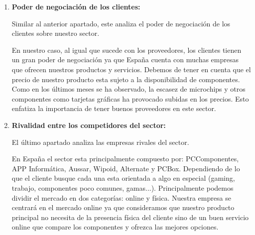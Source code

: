 \begin{enumerate}
    \item \textbf{Poder de negociación de los clientes:}
    
    Similar al anterior apartado, este analiza el poder de negociación de los clientes sobre nuestro sector.

    En nuestro caso, al igual que sucede con los proveedores, los clientes tienen un gran poder de negociación ya que España cuenta con muchas empresas que ofrecen nuestros productos y servicios. Debemos de tener en cuenta que el precio de nuestro producto esta sujeto a la disponibilidad de componentes. Como en los últimos meses se ha observado, la escasez de microchips y otros componentes como tarjetas gráficas ha provocado subidas en los precios. Esto enfatiza la importancia de tener buenos proveedores en este sector.

    \item \textbf{Rivalidad entre los competidores del sector:}
    
    El último apartado analiza las empresas rivales del sector.

    En España el sector esta principalmente compuesto por: PCComponentes, APP Informática, Aussar, Wipoid, Alternate y PCBox. Dependiendo de lo que el cliente busque cada una esta orientada a algo en especial (gaming, trabajo, componentes poco comunes, gamas...). Principalmente podemos dividir el mercado en dos categorías: online y física. Nuestra empresa se centrará en el mercado online ya que consideramos que nuestro producto principal no necesita de la presencia física del cliente sino de un buen servicio online que compare los componentes y ofrezca las mejores opciones.

\end{enumerate}